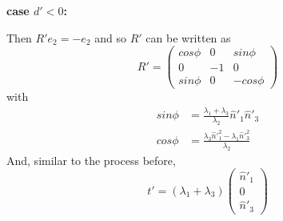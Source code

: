 \documentclass{article}
\begin{document}
\noindent
\textbf {case $d' < 0$:}

\noindent
Then $R' e_2 = -e_2$ and so $R'$ can be written as
%
\begin {equation}
R' =
\begin {pmatrix}
cos \phi &  0 &  sin \phi \\
0        & -1 &  0        \\
sin \phi &  0 & -cos \phi
\end {pmatrix}
\end {equation}
%
with
%
\begin {equation}
\begin {aligned}
sin \phi &= \frac {\lambda_1 + \lambda_3} {\lambda_2} \hat{n}'_1 \hat{n}'_3 \\
cos \phi &= \frac {\lambda_3 \hat{n}'^2_1 - \lambda_1 \hat{n}'^2_3} {\lambda_2}
\end {aligned}
\end {equation}
%
And, similar to the process before,
%
\begin {equation}
t' = (\lambda_1 + \lambda_3)
\begin {pmatrix}
\hat{n}'_1 \\
0 \\
\hat{n}'_3
\end {pmatrix}
\end {equation}
%
\end{document}

